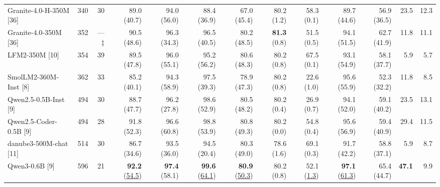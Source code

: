 \documentclass{article}
\begin{document}
\begin{table}[htbp]
{\begin{tabular}{lrr|rrr|rrrrrrr}
Granite-4.0-H-350M [36] & 340 & 30 & 89.0 {\scriptsize (40.7)} & 94.0 {\scriptsize (56.0)} & 88.4 {\scriptsize (36.9)} & 67.0 {\scriptsize (45.4)} & 80.2 {\scriptsize (1.2)} & 58.3 {\scriptsize (0.1)} & 89.7 {\scriptsize (44.6)} & 56.9 {\scriptsize (36.5)} & 23.5 & 12.3 \\
Granite-4.0-350M [36] & 352 & ---$\ddagger$ & 90.5 {\scriptsize (48.6)} & 96.3 {\scriptsize (34.3)} & 96.5 {\scriptsize (40.5)} & 80.2 {\scriptsize (48.5)} & \textbf{81.3} {\scriptsize (0.8)} & 51.5 {\scriptsize (0.5)} & 94.1 {\scriptsize (51.5)} & 62.7 {\scriptsize (41.9)} & 11.8 & 11.1 \\
LFM2-350M [10] & 354 & 39 & 89.5 {\scriptsize (47.8)} & 96.0 {\scriptsize (55.1)} & 95.2 {\scriptsize (56.2)} & 80.6 {\scriptsize (48.3)} & 80.2 {\scriptsize (0.8)} & 67.5 {\scriptsize (0.1)} & 93.1 {\scriptsize (54.9)} & 58.1 {\scriptsize (37.7)} & 5.9 & 5.7 \\
SmolLM2-360M-Inst [8] & 362 & 33 & 85.2 {\scriptsize (40.1)} & 94.3 {\scriptsize (58.9)} & 97.5 {\scriptsize (39.3)} & 78.9 {\scriptsize (47.3)} & 80.2 {\scriptsize (0.8)} & 22.6 {\scriptsize (1.0)} & 95.6 {\scriptsize (55.9)} & 52.3 {\scriptsize (32.2)} & 11.8 & 8.5 \\
Qwen2.5-0.5B-Inst [9] & 494 & 30 & 88.7 {\scriptsize (47.7)} & 96.2 {\scriptsize (27.8)} & 98.6 {\scriptsize (52.9)} & 80.5 {\scriptsize (48.2)} & 80.2 {\scriptsize (0.4)} & 26.9 {\scriptsize (0.7)} & 94.1 {\scriptsize (52.0)} & 59.1 {\scriptsize (40.2)} & 23.5 & 13.1 \\
Qwen2.5-Coder-0.5B [9] & 494 & 28 & 91.8 {\scriptsize (52.3)} & 96.6 {\scriptsize (60.8)} & 98.8 {\scriptsize (53.9)} & 80.8 {\scriptsize (49.3)} & 80.2 {\scriptsize (0.0)} & 54.8 {\scriptsize (0.4)} & 95.6 {\scriptsize (56.9)} & 59.4 {\scriptsize (40.9)} & 29.4 & 11.5 \\
danube3-500M-chat [11] & 514 & 30 & 86.7 {\scriptsize (34.6)} & 93.5 {\scriptsize (36.0)} & 94.5 {\scriptsize (20.4)} & 80.3 {\scriptsize (49.0)} & 78.6 {\scriptsize (1.6)} & 69.1 {\scriptsize (0.3)} & 91.7 {\scriptsize (42.2)} & 58.8 {\scriptsize (37.1)} & 5.9 & 8.7 \\
Qwen3-0.6B [9] & 596 & 21 & \textbf{92.2} {\scriptsize (\underline{54.5})} & \textbf{97.4} {\scriptsize (58.1)} & \textbf{99.6} {\scriptsize (\underline{64.1})} & \textbf{80.9} {\scriptsize (\underline{50.3})} & 80.2 {\scriptsize (0.8)} & 52.1 {\scriptsize (\underline{1.3})} & \textbf{97.1} {\scriptsize (\underline{61.3})} & 65.4 {\scriptsize (44.7)} & \textbf{47.1} & 9.9 \\

\end{tabular}}
\end{table}
\end{document}
